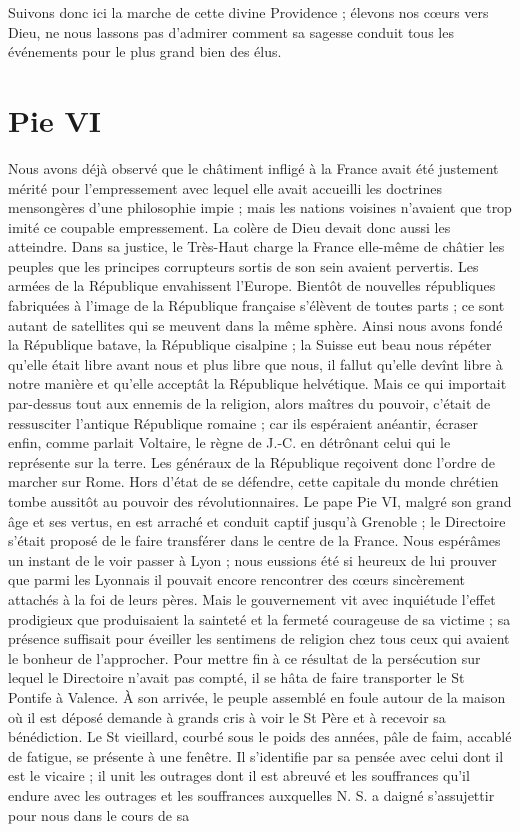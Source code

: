 Suivons donc ici la marche de cette divine Providence ; élevons nos cœurs vers Dieu, ne nous lassons pas d'admirer comment sa sagesse conduit tous les événements pour le plus grand bien des élus.

\section*{Pie VI}
Nous avons déjà observé que le châtiment infligé à la France avait été justement mérité pour l'empressement avec lequel elle avait accueilli les doctrines mensongères d'une philosophie impie ; mais les nations voisines n'avaient que trop imité ce coupable empressement. La colère de Dieu devait donc aussi les atteindre. Dans sa justice, le Très-Haut charge la France elle-même de châtier les peuples que les principes corrupteurs sortis de son sein avaient pervertis. Les armées de la République envahissent l'Europe. Bientôt de nouvelles républiques fabriquées à l'image de la République française s'élèvent de toutes parts ; ce sont autant de satellites qui se meuvent dans la même sphère. Ainsi nous avons fondé la République batave, la République cisalpine ; la Suisse eut beau nous répéter qu'elle était libre avant nous et plus libre que nous, il fallut qu'elle devînt libre à notre manière et qu'elle acceptât la République helvétique. Mais ce qui importait par-dessus tout aux ennemis de la religion, alors maîtres du pouvoir, c'était de ressusciter l'antique République romaine ; car ils espéraient anéantir, écraser enfin, comme parlait Voltaire, le règne de J.-C. en détrônant celui qui le représente
sur la terre. Les généraux de la République reçoivent donc l'ordre de marcher sur Rome. Hors d'état de se défendre, cette capitale du monde chrétien tombe aussitôt au pouvoir des révolutionnaires. Le pape Pie VI, malgré son grand âge et ses vertus, en est arraché et conduit captif jusqu'à Grenoble ; le Directoire s'était proposé de le faire transférer dans le centre de la France. Nous espérâmes un instant de le voir passer à Lyon ; nous eussions été si heureux de lui prouver que parmi les Lyonnais il pouvait encore rencontrer des cœurs sincèrement attachés à la foi de leurs pères. Mais le gouvernement vit avec inquiétude l'effet prodigieux que produisaient la sainteté et la fermeté courageuse de sa victime ; sa présence suffisait pour éveiller les sentimens de religion chez tous ceux qui avaient le bonheur de l'approcher. Pour mettre fin à ce résultat de la persécution sur lequel le Directoire n'avait pas compté, il se hâta de faire transporter le St Pontife à Valence. À son arrivée, le peuple assemblé en foule autour de la maison où il est déposé demande à grands cris à voir le St Père et à recevoir sa bénédiction. Le St vieillard, courbé sous le poids des années, pâle de faim, accablé de fatigue, se présente à une fenêtre. Il s'identifie par sa pensée avec celui dont il est le vicaire ; il unit les outrages dont il est abreuvé et les souffrances qu'il endure avec les outrages et les souffrances auxquelles N. S. a daigné s'assujettir pour nous dans le cours de sa
